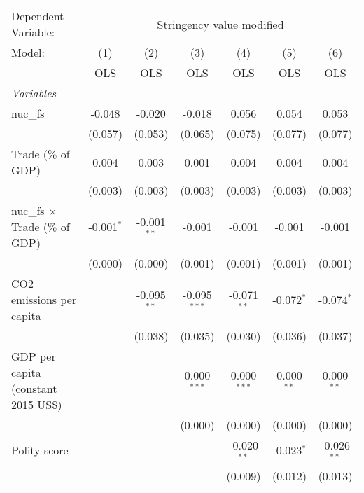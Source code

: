 
\begingroup
\centering
\begin{tabular}{lcccccc}
   \toprule
   Dependent Variable: & \multicolumn{6}{c}{Stringency value modified}\\
   Model:                                & (1)          & (2)           & (3)            & (4)           & (5)          & (6)\\  
                                         &  OLS         & OLS           & OLS            & OLS           & OLS          & OLS\\  
   \midrule
   \emph{Variables}\\
   nuc\_fs                               & -0.048       & -0.020        & -0.018         & 0.056         & 0.054        & 0.053\\   
                                         & (0.057)      & (0.053)       & (0.065)        & (0.075)       & (0.077)      & (0.077)\\   
   Trade (\% of GDP)                     & 0.004        & 0.003         & 0.001          & 0.004         & 0.004        & 0.004\\   
                                         & (0.003)      & (0.003)       & (0.003)        & (0.003)       & (0.003)      & (0.003)\\   
   nuc\_fs $\times$ Trade (\% of GDP)    & -0.001$^{*}$ & -0.001$^{**}$ & -0.001         & -0.001        & -0.001       & -0.001\\   
                                         & (0.000)      & (0.000)       & (0.001)        & (0.001)       & (0.001)      & (0.001)\\   
   CO2 emissions per capita              &              & -0.095$^{**}$ & -0.095$^{***}$ & -0.071$^{**}$ & -0.072$^{*}$ & -0.074$^{*}$\\   
                                         &              & (0.038)       & (0.035)        & (0.030)       & (0.036)      & (0.037)\\   
   GDP per capita (constant 2015 US\$)   &              &               & 0.000$^{***}$  & 0.000$^{***}$ & 0.000$^{**}$ & 0.000$^{**}$\\   
                                         &              &               & (0.000)        & (0.000)       & (0.000)      & (0.000)\\   
   Polity score                          &              &               &                & -0.020$^{**}$ & -0.023$^{*}$ & -0.026$^{**}$\\   
                                         &              &               &                & (0.009)       & (0.012)      & (0.013)\\   

\end{tabular}
